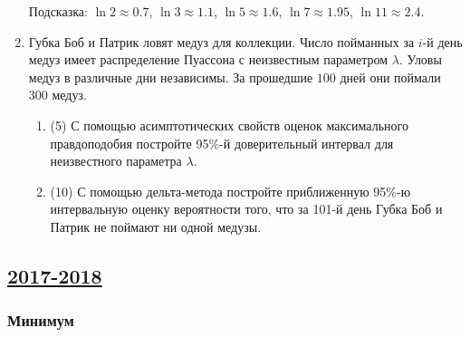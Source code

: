 \begin{enumerate}
Подсказка: $\ln 2 \approx 0.7$, $\ln 3 \approx 1.1$, $\ln 5 \approx 1.6$, $\ln 7 \approx 1.95$, $\ln 11 \approx 2.4$.


\item Губка Боб и Патрик ловят медуз для коллекции. Число пойманных за $i$-й день медуз имеет распределение Пуассона с неизвестным параметром $\lambda$. Уловы медуз в различные дни независимы. За прошедшие $100$ дней они поймали $300$ медуз. 

\begin{enumerate}
    \item (5) С помощью асимптотических свойств оценок максимального правдоподобия постройте 95\%-й доверительный интервал для неизвестного параметра $\lambda$.
    \item (10) С помощью дельта-метода постройте приближенную 95\%-ю интервальную оценку вероятности того, что за 101-й день Губка Боб и Патрик не поймают ни одной медузы.
\end{enumerate}

\end{enumerate}





\subsection[2017-2018]{\hyperref[sec:sol_kr_04_2017_2018]{2017-2018}}
\label{sec:kr_04_2017_2018}


\subsubsection*{Минимум}

